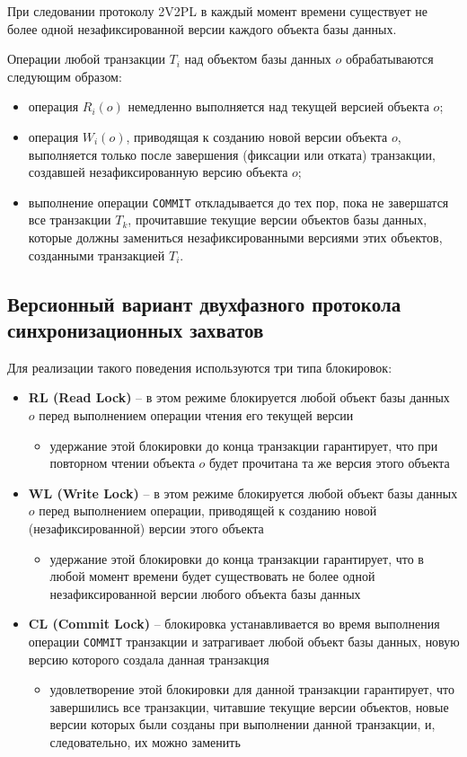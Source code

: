 \documentclass[a4paper,12pt]{article}
\begin{document}
При следовании протоколу 2V2PL в каждый момент времени существует не более одной незафиксированной версии каждого объекта базы данных.

Операции любой транзакции $T_i$ над объектом базы данных $o$ обрабатываются следующим образом:
\begin{itemize}
    \item операция $R_i(o)$ немедленно выполняется над текущей версией объекта $o$;
    \item операция $W_i(o)$, приводящая к созданию новой версии объекта $o$, выполняется только после завершения (фиксации или отката) транзакции, создавшей незафиксированную версию объекта $o$;
    \item выполнение операции \texttt{COMMIT} откладывается до тех пор, пока не завершатся все транзакции $T_k$, прочитавшие текущие версии объектов базы данных, которые должны замениться незафиксированными версиями этих объектов, созданными транзакцией $T_i$.
\end{itemize}

\subsection{Версионный вариант двухфазного протокола синхронизационных захватов}

Для реализации такого поведения используются три типа блокировок:
\begin{itemize}
    \item \textbf{RL (Read Lock)} – в этом режиме блокируется любой объект базы данных $o$ перед выполнением операции чтения его текущей версии
    \begin{itemize}
        \item удержание этой блокировки до конца транзакции гарантирует, что при повторном чтении объекта $o$ будет прочитана та же версия этого объекта
    \end{itemize}
    \item \textbf{WL (Write Lock)} – в этом режиме блокируется любой объект базы данных $o$ перед выполнением операции, приводящей к созданию новой (незафиксированной) версии этого объекта
    \begin{itemize}
        \item удержание этой блокировки до конца транзакции гарантирует, что в любой момент времени будет существовать не более одной незафиксированной версии любого объекта базы данных
    \end{itemize}
    \item \textbf{CL (Commit Lock)} – блокировка устанавливается во время выполнения операции \texttt{COMMIT} транзакции и затрагивает любой объект базы данных, новую версию которого создала данная транзакция
    \begin{itemize}
        \item удовлетворение этой блокировки для данной транзакции гарантирует, что завершились все транзакции, читавшие текущие версии объектов, новые версии которых были созданы при выполнении данной транзакции, и, следовательно, их можно заменить
    \end{itemize}
\end{itemize}
\end{document}
